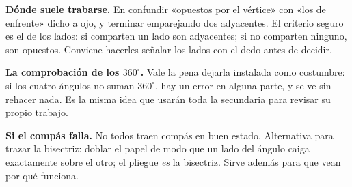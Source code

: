 \documentclass[11pt]{article}
\begin{document}
\begin{nota}
\textbf{Dónde suele trabarse.} En confundir «opuestos por el vértice» con «los de enfrente»
dicho a ojo, y terminar emparejando dos adyacentes. El criterio seguro es el de los lados: si
comparten un lado son adyacentes; si no comparten ninguno, son opuestos. Conviene hacerles
señalar los lados con el dedo antes de decidir.
\end{nota}

\begin{nota}
\textbf{La comprobación de los $360^\circ$.} Vale la pena dejarla instalada como costumbre: si
los cuatro ángulos no suman $360^\circ$, hay un error en alguna parte, y se ve sin rehacer
nada. Es la misma idea que usarán toda la secundaria para revisar su propio trabajo.
\end{nota}

\begin{nota}
\textbf{Si el compás falla.} No todos traen compás en buen estado. Alternativa para trazar la
bisectriz: doblar el papel de modo que un lado del ángulo caiga exactamente sobre el otro; el
pliegue \emph{es} la bisectriz. Sirve además para que vean por qué funciona.
\end{nota}
\end{document}
